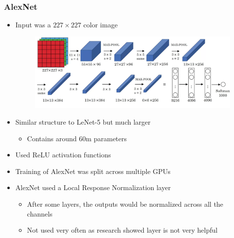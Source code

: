 \documentclass[12pt, letterpaper]{article}
\begin{document}
    \subsubsection{AlexNet}
    \begin{itemize}
        \item Input was a $227\times 227$ color image
        \begin{figure}[ht]
            \centering
            \includegraphics[width=16cm]{25.png}
        \end{figure}
        \item Similar structure to LeNet-5 but much larger
        \begin{itemize}
            \item Contains around 60m parameters
        \end{itemize}
        \item Used ReLU activation functions 
        \item Training of AlexNet was split across multiple GPUs
        \item AlexNet used a Local Response Normalization layer
        \begin{itemize}
            \item After some layers, the outputs would be normalized across all the channels
            \item Not used very often as research showed layer is not very helpful 
        \end{itemize}
    \end{itemize}
\end{document}
